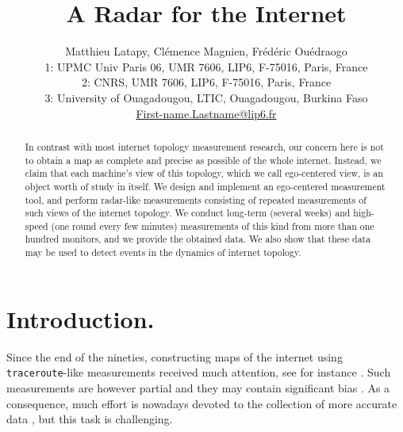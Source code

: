 \documentclass[times, 10pt,twocolumn]{article}
\newcommand{\traceroute}{{\tt trace\-route}}
\begin{document}
\title{A Radar for the Internet}
\author{
Matthieu Latapy, Cl\'emence Magnien, Fr\'ed\'eric Ou\'edraogo\\
1: UPMC Univ Paris 06, UMR 7606, LIP6, F-75016, Paris, France\\
2: CNRS, UMR 7606, LIP6, F-75016, Paris, France\\
3: University of Ouagadougou, LTIC, Ouagadougou, Burkina Faso\\
\url{First-name.Lastname@lip6.fr}}


\maketitle
\thispagestyle{empty}


\begin{abstract}

  In contrast with most internet topology measurement res\-earch, our
  concern here is not to obtain a map as complete and precise as
  possible of the whole internet. Instead, we claim that each
  machine's view of this topology, which we call ego-centered view, is
  an object worth of study in itself. We design and implement an
  ego-centered measurement tool, and perform radar-like measurements
  consisting of repeated measurements of such views of the internet topology. We
  conduct long-term (several weeks) and high-speed (one round every
  few minutes) measurements of this kind from more than one hundred
  monitors, and we provide the obtained data. We also show that these
  data may be used to detect events in the dynamics of internet
  topology.

\end{abstract}


\section{Introduction.}
\label{sec_introduction}

Since the end of the nineties,
constructing maps of the internet using \traceroute -like measurements
received much attention, see for instance
\cite{faloutsos99sigcomm, dimes,skitter,trahome,scamper,ripeNccTtm,nlanrAmp,whatToDo,atlas,heuristics,scriptroute}.
Such measurements are however partial and they may contain significant
bias
\cite{sampling,marginal,plrevisited,dallAsta,relevance,achlioptas05bias}.
As a consequence, much effort is nowadays devoted to the collection of
more accurate data \cite{dimes,trahome,e2emon2007,parisTraceroute}, but
this task is challenging.
\end{document}
